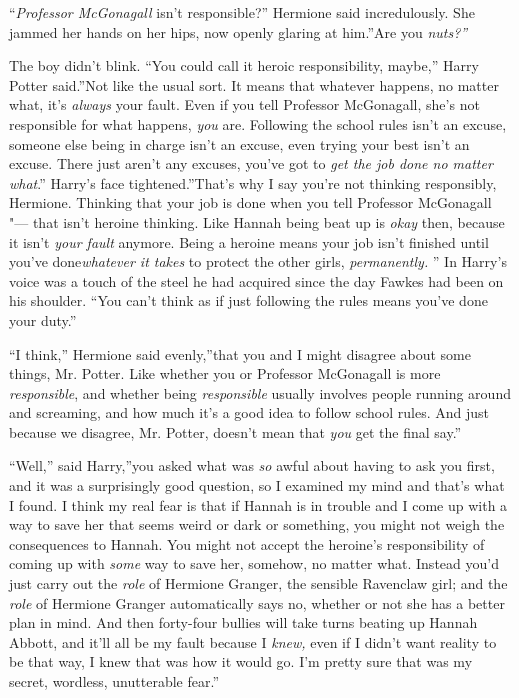 ``\emph{Professor McGonagall} isn't responsible?'' Hermione said
incredulously. She jammed her hands on her hips, now openly glaring at
him.''Are you \emph{nuts?''}

The boy didn't blink. ``You could call it heroic responsibility,
maybe,'' Harry Potter said.''Not like the usual sort. It means that
whatever happens, no matter what, it's \emph{always} your fault. Even if
you tell Professor McGonagall, she's not responsible for what happens,
\emph{you} are. Following the school rules isn't an excuse, someone else
being in charge isn't an excuse, even trying your best isn't an excuse.
There just aren't any excuses, you've got to \emph{get the job done no
matter what}.'' Harry's face tightened.''That's why I say you're not
thinking responsibly, Hermione. Thinking that your job is done when you
tell Professor McGonagall "--- that isn't heroine thinking. Like Hannah
being beat up is \emph{okay} then, because it isn't \emph{your fault}
anymore. Being a heroine means your job isn't finished until you've
done\emph{whatever it takes} to protect the other girls,
\emph{permanently.} '' In Harry's voice was a touch of the steel he had
acquired since the day Fawkes had been on his shoulder. ``You can't
think as if just following the rules means you've done your duty.''

``I think,'' Hermione said evenly,''that you and I might disagree about
some things, Mr. Potter. Like whether you or Professor McGonagall is
more \emph{responsible}, and whether being \emph{responsible} usually
involves people running around and screaming, and how much it's a good
idea to follow school rules. And just because we disagree, Mr. Potter,
doesn't mean that \emph{you} get the final say.''

``Well,'' said Harry,''you asked what was \emph{so} awful about having
to ask you first, and it was a surprisingly good question, so I examined
my mind and that's what I found. I think my real fear is that if Hannah
is in trouble and I come up with a way to save her that seems weird or
dark or something, you might not weigh the consequences to Hannah. You
might not accept the heroine's responsibility of coming up with
\emph{some} way to save her, somehow, no matter what. Instead you'd just
carry out the \emph{role} of Hermione Granger, the sensible Ravenclaw
girl; and the \emph{role} of Hermione Granger automatically says no,
whether or not she has a better plan in mind. And then forty-four
bullies will take turns beating up Hannah Abbott, and it'll all be my
fault because I \emph{knew,} even if I didn't want reality to be that
way, I knew that was how it would go. I'm pretty sure that was my
secret, wordless, unutterable fear.''

